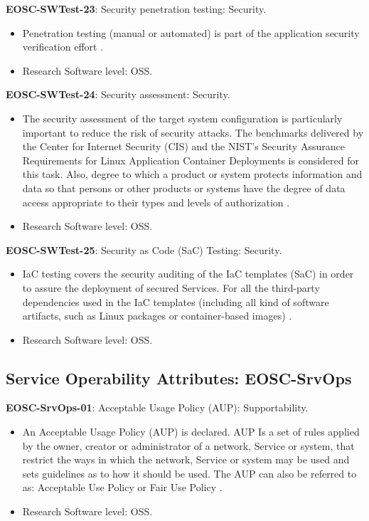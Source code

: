 \textbf{EOSC-SWTest-23}: Security penetration testing: Security.

\begin{itemize}
    \item Penetration testing (manual or automated) is part of the application security verification effort \cite{orviz_fernandez_eosc-synergy_2020}.
    \item Research Software level: OSS.
\end{itemize}

\textbf{EOSC-SWTest-24}: Security assessment: Security.

\begin{itemize}
    \item The security assessment of the target system configuration is particularly important to reduce the risk of security attacks. The benchmarks delivered by the Center for Internet Security (CIS) and the NIST's Security Assurance Requirements for Linux Application Container Deployments is considered for this task. Also, degree to which a product or system protects information and data so that persons or other products or systems have the degree of data access appropriate to their types and levels of authorization \cite{iso_25010_2011_2017,orviz_fernandez_eosc-synergy_2020}.
    \item Research Software level: OSS.
\end{itemize}

\textbf{EOSC-SWTest-25}: Security as Code (SaC) Testing: Security.

\begin{itemize}
    \item IaC testing covers the security auditing of the IaC templates (SaC) in order to assure the deployment of secured Services. For all the third-party dependencies used in the IaC templates (including all kind of software artifacts, such as Linux packages or container-based images) \cite{orviz_fernandez_eosc-synergy_2020}.
    \item Research Software level: OSS.
\end{itemize}

\subsection{Service Operability Attributes: EOSC-SrvOps}

\textbf{EOSC-SrvOps-01}: Acceptable Usage Policy (AUP): Supportability.

\begin{itemize}
    \item An Acceptable Usage Policy (AUP) is declared. AUP Is a set of rules applied by the owner, creator or administrator of a network, Service or system, that restrict the ways in which the network, Service or system may be used and sets guidelines as to how it should be used. The AUP can also be referred to as: Acceptable Use Policy or Fair Use Policy \cite{orviz_fernandez_eosc-synergy_2020}.
    \item Research Software level: OSS.
\end{itemize}


